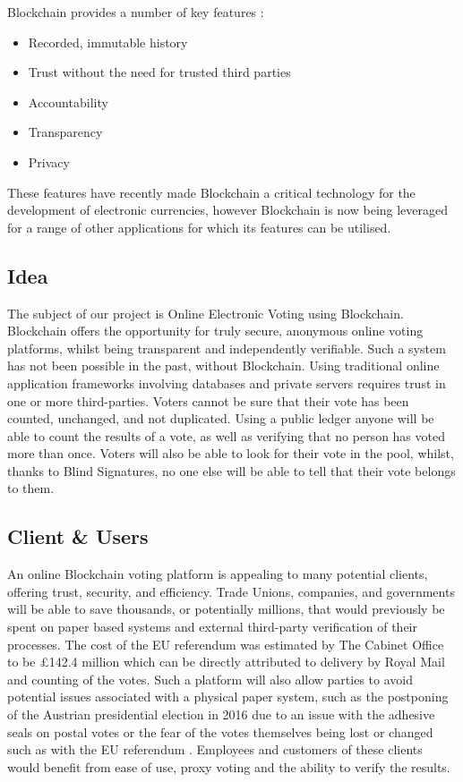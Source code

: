 \documentclass{article}
\begin{document}
\par

Blockchain provides a number of key features \parencite{blakemorganblockchain}:
\begin{itemize}
    \item Recorded, immutable history
    \item Trust without the need for trusted third parties
    \item Accountability
    \item Transparency
    \item Privacy
\end{itemize}

These features have recently made Blockchain a critical technology for the development of electronic currencies, however Blockchain is now being leveraged for a range of other applications for which its features can be utilised.

\subsection{Idea}

The subject of our project is Online Electronic Voting using Blockchain. Blockchain offers the opportunity for truly secure, anonymous online voting platforms, whilst being transparent and independently verifiable. Such a system has not been possible in the past, without Blockchain. Using traditional online application frameworks involving databases and private servers requires trust in one or more third-parties. Voters cannot be sure that their vote has been counted, unchanged, and not duplicated. Using a public ledger anyone will be able to count the results of a vote, as well as verifying that no person has voted more than once. Voters will also be able to look for their vote in the pool, whilst, thanks to Blind Signatures, no one else will be able to tell that their vote belongs to them.

\subsection{Client \& Users}

An online Blockchain voting platform is appealing to many potential clients, offering trust, security, and efficiency. Trade Unions, companies, and governments will be able to save thousands, or potentially millions, that would previously be spent on paper based systems and external third-party verification of their processes. The cost of the EU referendum was estimated by The Cabinet Office to be £142.4 million \parencite{eurefcost} which can be directly attributed to delivery by Royal Mail and counting of the votes. Such a platform will also allow parties to avoid potential issues associated with a physical paper system, such as the postponing of the Austrian presidential election in 2016 due to an issue with the adhesive seals on postal votes \parencite{Austrian41:online} or the fear of the votes themselves being lost or changed such as with the EU referendum \parencite{Thousand11:online}. Employees and customers of these clients would benefit from ease of use, proxy voting and the ability to verify the results.
\end{document}
